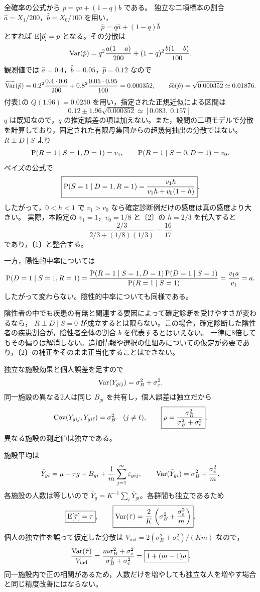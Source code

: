 \documentclass[a4paper,11pt]{ltjsarticle}
\begin{document}
全確率の公式から $p=qa+(1-q)b$ である。
独立な二項標本の割合 $\hat a=X_1/200$，$\hat b=X_0/100$ を用い，
\[
\hat p=q\hat a+(1-q)\hat b
\]
とすれば $\operatorname{E}[\hat p]=p$ となる。その分散は
\[
\operatorname{Var}(\hat p)=q^2\frac{a(1-a)}{200}+(1-q)^2\frac{b(1-b)}{100}.
\]
観測値では $\hat a=0.4$，$\hat b=0.05$，$\hat p=0.12$ なので
\[
\widehat{\operatorname{Var}}(\hat p)=0.2^2\frac{0.4\cdot0.6}{200}
+0.8^2\frac{0.05\cdot0.95}{100}=0.000352,
\qquad \widehat{\operatorname{se}}(\hat p)=\sqrt{0.000352}\simeq0.01876.
\]
付表1の $Q(1.96)=0.0250$ を用い，指定された正規近似による区間は
\[
0.12\pm1.96\sqrt{0.000352}\simeq\boxed{[0.083,\ 0.157]}.
\]
$q$ は既知なので，$q$ の推定誤差の項は加えない。また，設問の二項モデルで分散を計算しており，固定された有限母集団からの超幾何抽出の分散ではない。
\newpage
{}
$R\perp D\mid S$ より
\[
\operatorname{P}(R=1\mid S=1,D=1)=v_1,\qquad
\operatorname{P}(R=1\mid S=0,D=1)=v_0.
\]
ベイズの公式で
\[
\boxed{\operatorname{P}(S=1\mid D=1,R=1)=\frac{v_1h}{v_1h+v_0(1-h)}}.
\]
したがって，$0<h<1$ で $v_1>v_0$ なら確定診断例だけの感度は真の感度より大きい。
実際，本設定の $v_1=1$，$v_0=1/8$ と〔2〕の $h=2/3$ を代入すると
\[
\frac{2/3}{2/3+(1/8)(1/3)}=\frac{16}{17}
\]
であり，〔1〕と整合する。

一方，陽性的中率については
\[
\operatorname{P}(D=1\mid S=1,R=1)
=\frac{\operatorname{P}(R=1\mid S=1,D=1)\operatorname{P}(D=1\mid S=1)}{\operatorname{P}(R=1\mid S=1)}
=\frac{v_1a}{v_1}=a.
\]
したがって変わらない。陰性的中率についても同様である。

陰性者の中でも疾患の有無と関連する要因によって確定診断を受けやすさが変わるなら，
$R\perp D\mid S=0$ が成立するとは限らない。この場合，確定診断した陰性者の疾患割合が，陰性者全体の割合 $b$ を代表するとはいえない。
一律に8倍してもその偏りは解消しない。追加情報や選択の仕組みについての仮定が必要であり，〔2〕の補正をそのまま正当化することはできない。
\newpage

独立な施設効果と個人誤差を足すので
\[
\operatorname{Var}(Y_{gij})=\sigma_B^2+\sigma_e^2.
\]
同一施設の異なる2人は同じ $B_{gi}$ を共有し，個人誤差は独立だから
\[
\operatorname{Cov}(Y_{gij},Y_{gi\ell})=\sigma_B^2\quad(j\ne\ell),\qquad
\boxed{\rho=\frac{\sigma_B^2}{\sigma_B^2+\sigma_e^2}}.
\]
異なる施設の測定値は独立である。

施設平均は
\[
\bar Y_{gi}=\mu+\tau g+B_{gi}+\frac1m\sum_{j=1}^m\varepsilon_{gij},\qquad
\operatorname{Var}(\bar Y_{gi})=\sigma_B^2+\frac{\sigma_e^2}{m}.
\]
各施設の人数は等しいので $\bar Y_g=K^{-1}\sum_i\bar Y_{gi}$。各群間も独立であるため
\[
\boxed{\operatorname{E}[\hat\tau]=\tau},\qquad
\boxed{\operatorname{Var}(\hat\tau)=\frac2K\left(\sigma_B^2+\frac{\sigma_e^2}{m}\right)}.
\]
個人の独立性を誤って仮定した分散は $V_{\mathrm{ind}}=2(\sigma_B^2+\sigma_e^2)/(Km)$ なので，
\[
\frac{\operatorname{Var}(\hat\tau)}{V_{\mathrm{ind}}}
=\frac{m\sigma_B^2+\sigma_e^2}{\sigma_B^2+\sigma_e^2}
=\boxed{1+(m-1)\rho}.
\]
同一施設内で正の相関があるため，人数だけを増やしても独立な人を増やす場合と同じ精度改善にはならない。
\end{document}
